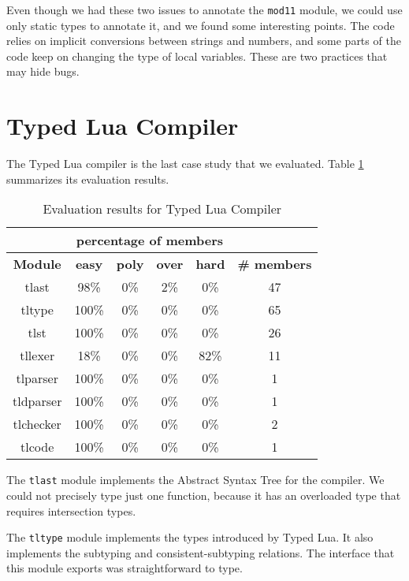 Even though we had these two issues to annotate the \texttt{mod11} module,
we could use only static types to annotate it, and we found some interesting
points.
The code relies on implicit conversions between strings and numbers,
and some parts of the code keep on changing the type of local variables.
These are two practices that may hide bugs.

\section{Typed Lua Compiler}

The Typed Lua compiler is the last case study that we evaluated.
Table \ref{tab:evaltlc} summarizes its evaluation results.

\begin{table}[!ht]
\begin{center}
\begin{tabular}{|c|c|c|c|c|c|}
\cline{2-5}
\multicolumn{1}{c}{} & \multicolumn{4}{|c|}{percentage of members} & \multicolumn{1}{c}{} \\
\hline
\textbf{Module} & \textbf{easy} & \textbf{poly} & \textbf{over} & \textbf{hard} & \textbf{\# members} \\
\hline
tlast & 98\% & 0\% & 2\% & 0\% & 47 \\ %
\hline
tltype & 100\% & 0\% & 0\% & 0\% & 65 \\ %
\hline
tlst & 100\% & 0\% & 0\% & 0\% & 26 \\ %
\hline
tllexer & 18\% & 0\% & 0\% & 82\% & 11 \\ %
\hline
tlparser & 100\% & 0\% & 0\% & 0\% & 1 \\ %
\hline
tldparser & 100\% & 0\% & 0\% & 0\% & 1 \\ %
\hline
tlchecker & 100\% & 0\% & 0\% & 0\% & 2 \\ %
\hline
tlcode & 100\% & 0\% & 0\% & 0\% & 1 \\ %
\hline
\end{tabular}
\end{center}
\caption{Evaluation results for Typed Lua Compiler}
\label{tab:evaltlc}
\end{table}

The \texttt{tlast} module implements the Abstract Syntax Tree for
the compiler.
We could not precisely type just one function, because it has
an overloaded type that requires intersection types.

The \texttt{tltype} module implements the types introduced by Typed Lua.
It also implements the subtyping and consistent-subtyping relations.
The interface that this module exports was straightforward to type.


